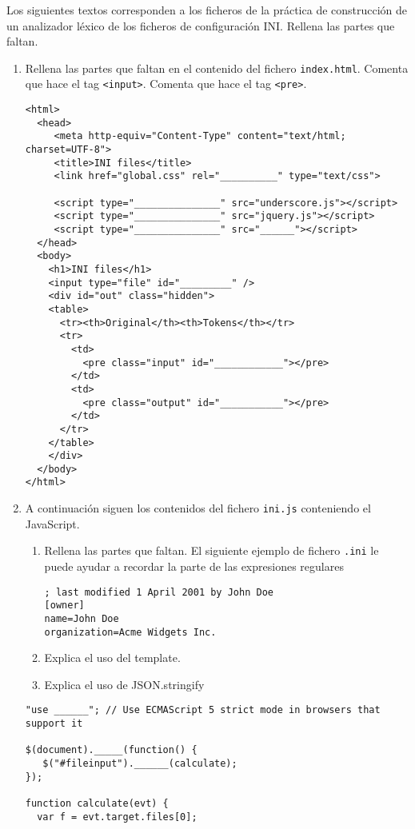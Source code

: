 \item 
Los siguientes textos corresponden  a los ficheros de 
la práctica 
de construcción de un analizador léxico de los ficheros de configuración INI. 
Rellena las partes que faltan.
\begin{enumerate}
\item  Rellena las partes que faltan en el contenido del fichero \verb|index.html|. 
Comenta que hace el tag \verb|<input>|.
Comenta que hace el tag \verb|<pre>|.
\begin{verbatim}
<html>
  <head>
     <meta http-equiv="Content-Type" content="text/html; charset=UTF-8">
     <title>INI files</title>
     <link href="global.css" rel="__________" type="text/css">

     <script type="_______________" src="underscore.js"></script>
     <script type="_______________" src="jquery.js"></script>
     <script type="_______________" src="______"></script>
  </head>
  <body>
    <h1>INI files</h1>
    <input type="file" id="_________" />
    <div id="out" class="hidden">
    <table>
      <tr><th>Original</th><th>Tokens</th></tr>
      <tr>
        <td>
          <pre class="input" id="____________"></pre>
        </td>
        <td>
          <pre class="output" id="___________"></pre>
        </td>
      </tr>
    </table>
    </div>
  </body>
</html>
\end{verbatim}

\item 
A continuación siguen los contenidos del fichero \verb|ini.js| conteniendo el JavaScript.
\begin{enumerate}
\item 
Rellena las partes que faltan. 
El siguiente ejemplo de fichero \verb|.ini| le puede ayudar
a recordar la parte de las expresiones regulares 
\begin{verbatim}
; last modified 1 April 2001 by John Doe
[owner]
name=John Doe
organization=Acme Widgets Inc.
\end{verbatim}
\item 
Explica 
el uso del template.
\item 
Explica el uso de JSON.stringify
\end{enumerate}
\begin{verbatim}
"use ______"; // Use ECMAScript 5 strict mode in browsers that support it

$(document)._____(function() {
   $("#fileinput").______(calculate);
});

function calculate(evt) {
  var f = evt.target.files[0]; 


\end{verbatim}
\end{enumerate}
